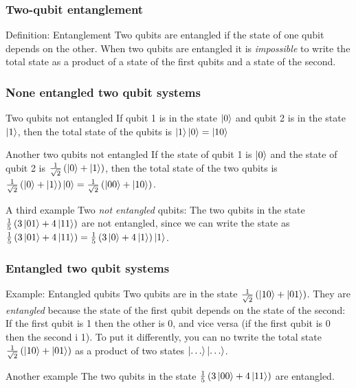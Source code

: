 \documentclass[10pt]{beamer}
\begin{document}
\begin{frame}
  \frametitle{Two-qubit entanglement}
  \begin{block}{Definition: Entanglement}
  Two qubits are entangled if the state of one qubit depends on the other. When two qubits are entangled it is \textit{impossible} to write the total state as a product of a state of the first qubits and a state of the second.
  \end{block}
\end{frame}

\begin{frame}
  \frametitle{None entangled two qubit systems}
  \begin{block}{Two qubits not entangled}
    If qubit 1 is in the state $\ket{0}$ and qubit 2 is in the state $\ket{1}$, then the total state of the qubits is $\ket{1}\ket{0} = \ket{10}$
  \end{block}
  \begin{block}{Another two qubits not entangled}
    If the state of qubit 1 is $\ket{0}$ and the state of qubit 2 is $\frac{1}{\sqrt{2}}\left( \ket{0}+\ket{1} \right)$, then the total state of the two qubits is $\frac{1}{\sqrt{2}}\left( \ket{0}+\ket{1} \right)\ket{0}=\frac{1}{\sqrt{2}}\left( \ket{00}+\ket{10} \right)$.
  \end{block}

  \begin{block}{A third example}
    Two \emph{not entangled} qubits: The two qubits in the state $\frac{1}{5}\left( 3 \ket{01}+4 \ket{11} \right)$ are not entangled, since we can write the state as $\frac{1}{5}\left( 3 \ket{01}+4 \ket{11} \right)= \frac{1}{5}\left( 3 \ket{0}+4 \ket{1} \right)\ket{1}$.
  \end{block}
\end{frame}

\begin{frame}
  \frametitle{Entangled two qubit systems}
  \begin{block}{Example: Entangled qubits}
    Two qubits are in the state $\frac{1}{\sqrt{2}}\left( \ket{10}+\ket{01} \right)$. They are \emph{entangled} because the state of the first qubit depends on the state of the second: If the first qubit is 1 then the other is 0, and vice versa (if the first qubit is 0 then the second i 1). To put it differently, you can no twrite the total state $\frac{1}{\sqrt{2}}\left( \ket{10}+\ket{01} \right)$ as a product of two states $\ket{\dots}\ket{\dots}$.
  \end{block}

  \begin{block}{Another example}
    The two qubits in the state $\frac{1}{5}\left( 3\ket{00}+4 \ket{11} \right)$ are entangled.
  \end{block}
\end{frame}
\end{document}
